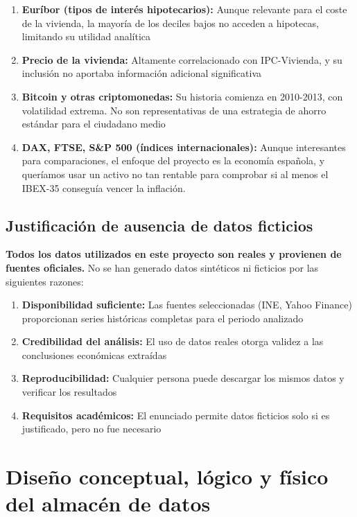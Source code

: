 \documentclass{article}
\begin{document}
\begin{enumerate}
    \item \textbf{Eur\'ibor (tipos de inter\'es hipotecarios):} Aunque relevante para el coste de la vivienda, la mayor\'ia de los deciles bajos no acceden a hipotecas, limitando su utilidad anal\'itica
    \item \textbf{Precio de la vivienda:} Altamente correlacionado con IPC-Vivienda, y su inclusi\'on no aportaba informaci\'on adicional significativa
    \item \textbf{Bitcoin y otras criptomonedas:} Su historia comienza en 2010-2013, con volatilidad extrema. No son representativas de una estrategia de ahorro est\'andar para el ciudadano medio
    \item \textbf{DAX, FTSE, S\&P 500 (\'indices internacionales):} Aunque interesantes para comparaciones, el enfoque del proyecto es la econom\'ia espa\~nola, y quer\'iamos usar un activo no tan rentable para comprobar si al menos el IBEX-35 consegu\'ia vencer la inflaci\'on.
\end{enumerate}

\subsection{Justificaci\'on de ausencia de datos ficticios}

\textbf{Todos los datos utilizados en este proyecto son reales y provienen de fuentes oficiales.} No se han generado datos sint\'eticos ni ficticios por las siguientes razones:

\begin{enumerate}
    \item \textbf{Disponibilidad suficiente:} Las fuentes seleccionadas (INE, Yahoo Finance) proporcionan series hist\'oricas completas para el periodo analizado
    \item \textbf{Credibilidad del an\'alisis:} El uso de datos reales otorga validez a las conclusiones econ\'omicas extra\'idas
    \item \textbf{Reproducibilidad:} Cualquier persona puede descargar los mismos datos y verificar los resultados
    \item \textbf{Requisitos acad\'emicos:} El enunciado permite datos ficticios solo si es justificado, pero no fue necesario
\end{enumerate}


\section{Dise\~no conceptual, l\'ogico y f\'isico del almac\'en de datos}
\end{document}
